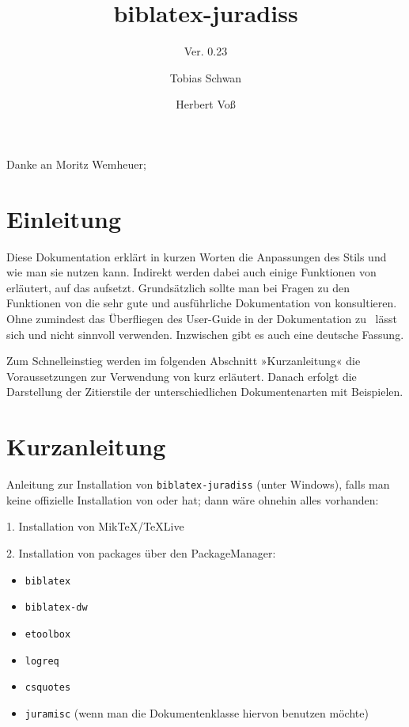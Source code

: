 
\title{biblatex-juradiss}
\subtitle{Ver. 0.23}
\author{Tobias Schwan \and Herbert Voß}

\maketitle

\vfill
Danke an Moritz Wemheuer;

\newpage

\tableofcontents

\newpage
\section{Einleitung}


Diese Dokumentation erklärt in kurzen Worten die Anpassungen des Stils \bibj und wie man sie 
nutzen kann. Indirekt werden dabei auch einige Funktionen von \bib erläutert, auf das 
aufsetzt. Grundsätzlich sollte man bei Fragen zu den Funktionen von \bib die sehr gute und 
ausführliche Dokumentation von \bib konsultieren. Ohne zumindest das Überfliegen des 
User-Guide in der Dokumentation zu \bib\ lässt sich \bib und \bibj nicht sinnvoll verwenden. 
Inzwischen gibt es auch eine deutsche Fassung.

Zum Schnelleinstieg werden im folgenden Abschnitt »Kurzanleitung« die Voraussetzungen zur Verwendung von \bibj 
kurz erläutert. Danach erfolgt die Darstellung der Zitierstile der unterschiedlichen Dokumentenarten 
mit Beispielen.


\section{Kurzanleitung}


Anleitung zur Installation von \texttt{biblatex-juradiss} (unter Windows), falls man keine offizielle
Installation von \MiKTeX oder \TeXLive hat; dann wäre ohnehin alles vorhanden:

1. Installation von Mik\TeX/\TeX Live

2. Installation von packages über den PackageManager:
\begin{itemize}
\item \texttt{biblatex}
\item \texttt{biblatex-dw}
\item \texttt{etoolbox}
\item \texttt{logreq}
\item \texttt{csquotes}
\item \texttt{juramisc} (wenn man die Dokumentenklasse hiervon benutzen möchte)
\end{itemize}



